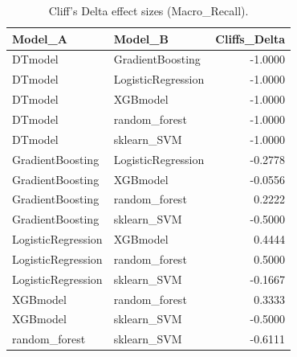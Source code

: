 \begin{table}[t]
\centering
\begin{tabular}{llr}
\toprule
Model_A & Model_B & Cliffs_Delta \\
\midrule
DTmodel & GradientBoosting & -1.0000 \\
DTmodel & LogisticRegression & -1.0000 \\
DTmodel & XGBmodel & -1.0000 \\
DTmodel & random_forest & -1.0000 \\
DTmodel & sklearn_SVM & -1.0000 \\
GradientBoosting & LogisticRegression & -0.2778 \\
GradientBoosting & XGBmodel & -0.0556 \\
GradientBoosting & random_forest & 0.2222 \\
GradientBoosting & sklearn_SVM & -0.5000 \\
LogisticRegression & XGBmodel & 0.4444 \\
LogisticRegression & random_forest & 0.5000 \\
LogisticRegression & sklearn_SVM & -0.1667 \\
XGBmodel & random_forest & 0.3333 \\
XGBmodel & sklearn_SVM & -0.5000 \\
random_forest & sklearn_SVM & -0.6111 \\
\bottomrule
\end{tabular}
\caption{Cliff's Delta effect sizes (Macro_Recall).}
\label{tab:cliffs_Macro_Recall}
\end{table}